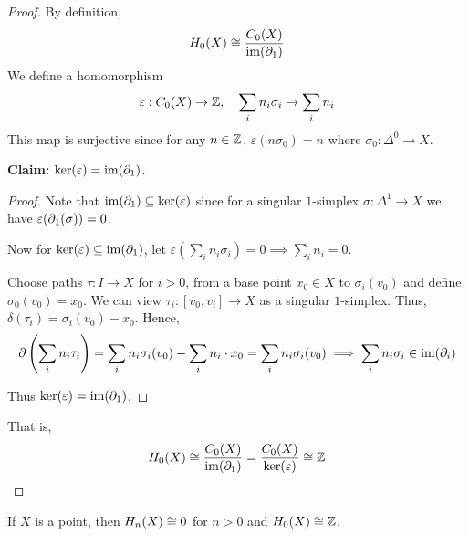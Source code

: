 \documentclass[12pt]{amsart}
\begin{document}
\begin{proof}
    By definition, 
    \[H_0(X) \cong \frac{C_0(X)}{\operatorname{im}(\partial_1)}\]
    We define a homomorphism 
    \[\varepsilon: C_0(X) \to \mathbb Z, \quad \sum_i n_i\sigma_i \mapsto \sum_i n_i\]
    This map is surjective since for any $n \in \mathbb Z$, $\varepsilon(n\sigma_0) = n$ where $\sigma_0: \Delta^0 \to X$. 

    \textbf{Claim:} $\ker(\varepsilon) = \operatorname{im}(\partial_1)$. 

    \begin{proof}
        Note that $\operatorname{im}(\partial_1) \subseteq \ker(\varepsilon)$ since for a singular $1$-simplex $\sigma: \Delta^1 \to X$ we have $\varepsilon(\partial_1(\sigma)) = 0$. 
        
        Now for $\ker(\varepsilon) \subseteq \operatorname{im}(\partial_1)$, let $\varepsilon\left(\sum_i n_i\sigma_i\right) = 0 \implies \sum_i n_i = 0$. 
        
        Choose paths $\tau: I \to X$ for $i >0$, from a base point $x_0 \in X$ to $\sigma_i(v_0)$ and define $\sigma_0(v_0) = x_0$. We can view $\tau_i: [v_0, v_i] \to X$ as a singular $1$-simplex. Thus, $\delta(\tau_i) = \sigma_i(v_0) - x_0$. Hence, 
        \[\partial\left(\sum_i n_i \tau_i\right) = \sum_i n_i \sigma_i(v_0) - \sum_i n_i \cdot x_0 = \sum_i n_i \sigma_i(v_0) \implies \sum_i n_i \sigma_i \in \operatorname{im}(\partial_i)\]

        Thus $\ker(\varepsilon) = \operatorname{im}(\partial_1)$. 
    \end{proof} 
    That is, 
    \[H_0(X) \cong \frac{C_0(X)}{\operatorname{im}(\partial_1)} = \frac{C_0(X)}{\ker(\varepsilon)} \cong \mathbb Z\]
\end{proof}

\begin{proposition}
    If $X$ is a point, then $H_n(X)\cong 0$ for $n > 0$ and $H_0(X) \cong \mathbb Z$.  
\end{proposition}
\end{document}
